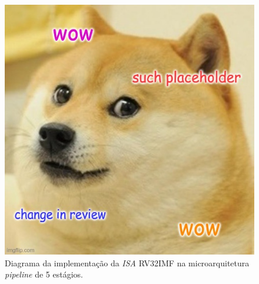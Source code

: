     \begin{figure}[H]
    \centering
        \includegraphics[width=1\linewidth]{../images/placeholder.jpg}
        \caption{Diagrama da implementação da \textit{ISA} RV32IMF na
        microarquitetura \textit{pipeline} de 5 estágios.}\label{fig:diagram_rv32imf_pipe}
    \end{figure}






